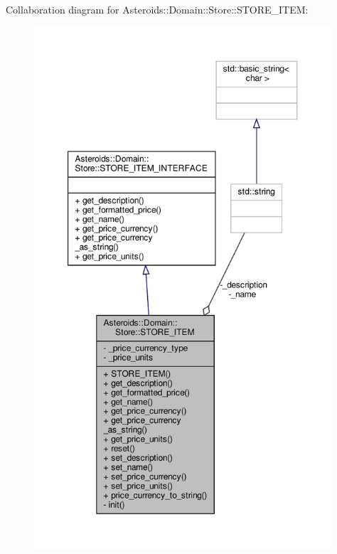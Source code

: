 Collaboration diagram for Asteroids\+:\+:Domain\+:\+:Store\+:\+:S\+T\+O\+R\+E\+\_\+\+I\+T\+EM\+:\nopagebreak
\begin{figure}[H]
\begin{center}
\leavevmode
\includegraphics[height=550pt]{classAsteroids_1_1Domain_1_1Store_1_1STORE__ITEM__coll__graph}
\end{center}
\end{figure}
